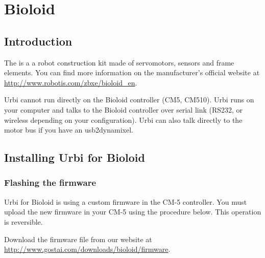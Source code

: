 
\chapter{Bioloid}
\label{sec:bioloid}

\section{Introduction}

The  is a a robot construction kit made of servomotors, sensors and
frame elements. You can find more information on the manufacturer's official
website at \url{http://www.robotis.com/zbxe/bioloid_en}.

Urbi cannot run directly on the Bioloid controller (CM5, CM510). Urbi runs on
your computer and talks to the Bioloid controller over serial link (RS232, or
wireless depending on your configuration). Urbi can also talk directly to the
motor bus if you have an usb2dynamixel.

\section{Installing Urbi for Bioloid}

\subsection{Flashing the firmware}

Urbi for Bioloid is using a custom firmware in the CM-5 controller. You must
upload the new firmware in your CM-5 using the procedure below. This operation
is reversible.

Download the firmware file from our website at
\url{http://www.gostai.com/downloads/bioloid/firmware}.

